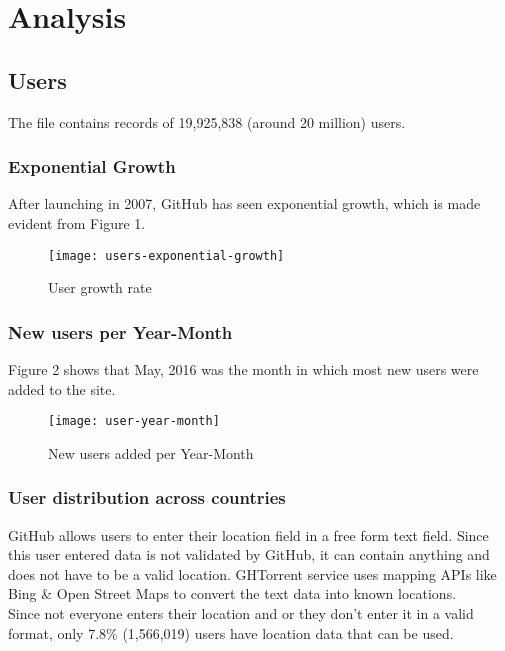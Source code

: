 \newpage

\section{Analysis}

\subsection{Users}

The  file contains records of 19,925,838 (around 20 million) users.

\subsubsection{Exponential Growth}

After launching in 2007, GitHub has seen exponential growth, which is made evident from Figure 1.

\begin{figure}[htb]
\centering
\texttt{[image: users-exponential-growth]}
\caption{User growth rate}
\end{figure}


\subsubsection{New users per Year-Month}

Figure 2 shows that May, 2016 was the month in which most new users were added to the site.

\begin{figure}[htb]
\centering
\texttt{[image: user-year-month]}
\caption{New users added per Year-Month}
\end{figure}

\subsubsection{User distribution across countries}

GitHub allows users to enter their location field in a free form text field.
Since this user entered data is not validated by GitHub, it can contain anything and does not have to be a valid location.
GHTorrent service uses mapping APIs like Bing \& Open Street Maps to convert the text data into known locations. \\

Since not everyone enters their location and or they don't enter it in a valid format, only 7.8\% (1,566,019) users have location data that can be used. \\

